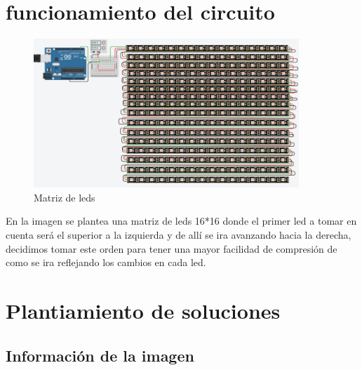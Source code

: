 \documentclass{article}
\begin{document}
\section{funcionamiento del circuito} \label{contenido}

\begin{figure}[h]
\includegraphics[width=10cm]{Simulación.png}
\centering
\caption{Matriz de leds}
\label{fig:matriz de leds}
\end{figure}
\label{contenio}
En la imagen se plantea una matriz de leds 16*16 donde el primer led a tomar en cuenta será el superior a la izquierda y de allí se ira avanzando hacia la derecha, decidimos tomar este orden para tener una mayor facilidad de compresión de como se ira reflejando los cambios en cada led.



\section{Plantiamiento de soluciones }

\subsection{Información de la imagen  }
\end{document}

